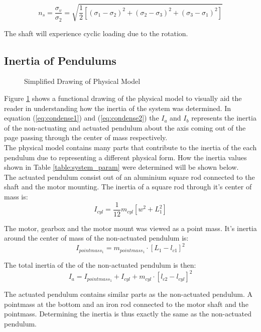 \begin{equation} \label{eq:vonMises}
n_{s} = \frac{\sigma_{v}}{\sigma_{2}} = \sqrt{\frac{1}{2}[(\sigma_{1}-\sigma_{2})^2+(\sigma_{2}-\sigma_{3})^2 + (\sigma_{3}-\sigma_{1})^2 ]}
\end{equation}


The shaft will experience cyclic loading due to the rotation.

\subsection{Inertia of Pendulums}
\begin{figure}[h]
	\centering
	
	\caption{Simplified Drawing of Physical Model}
	\label{fig:model_drawing}
\end{figure}

Figure \ref{fig:model_drawing} shows a functional drawing of the physical model to visually aid the reader in understanding how the inertia of the system was determined. In equation (\ref{eq:condense1}) and (\ref{eq:condense2}) the $I_{a}$ and $I_{b}$ represents the inertia of the non-actuating and actuated pendulum about the axis coming out of the page passing through the center of mass respectively.\\

The physical model contains many parts that contribute to the inertia of the each pendulum due to representing a different physical form. How the inertia values shown in Table \ref{table:system_param} were determined will be shown below.\\

The actuated pendulum consist out of an aluminium square rod connected to the shaft and the motor mounting. The inertia of a square rod through it's center of mass is: $$ I_{cyl} = \frac{1}{12}m_{cyl}[w^2+L^2_{1}]$$

The motor, gearbox and the motor mount was viewed as a point mass. It's inertia around the center of mass of the non-actuated pendulum is: $$I_{pointmass_1} = m_{pointmass_1}\cdot[L_{1}-l_{c1}]^2 $$

The total inertia of the of the non-actuated pendulum is then: $$ I_{a} =I_{pointmass_1} +  I_{cyl} + m_{cyl}\cdot[l_{c2}-l_{cyl}]^2 $$

The actuated pendulum contains similar parts as the non-actuated pendulum. A pointmass at the bottom and an iron rod connected to the motor shaft and the pointmass. Determining the inertia is thus exactly the same as the non-actuated pendulum.

